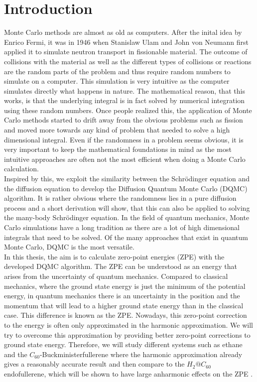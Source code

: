 \documentclass [12pt]{report}
\begin{document}
\chapter{Introduction}
Monte Carlo methods are almost as old as computers. After the inital idea by Enrico Fermi, it was in 1946 when Stanislaw Ulam and John von Neumann first applied it to simulate neutron transport in fissionable material. The outcome of collisions with the material as well as the different types of collisions or reactions are the random parts of the problem and thus require random numbers to simulate on a computer. This simulation is very intuitive as the computer simulates directly what happens in nature. The mathematical reason, that this works, is that the underlying integral is in fact solved by numerical integration using these random numbers. Once people realized this, the application of Monte Carlo methods started to drift away from the obvious problems such as fission and moved more towards any kind of problem that needed to solve a high dimensional integral. Even if the randomness in a problem seems obvious, it is very important to keep the mathematical foundations in mind as the most intuitive approaches are often not the most efficient when doing a Monte Carlo calculation.\\
Inspired by this, we exploit the similarity between the Schrödinger equation and the diffusion equation to develop the Diffusion Quantum Monte Carlo (DQMC) algorithm. It is rather obvious where the randomness lies in a pure diffusion process and a short derivation will show, that this can also be applied to solving the many-body Schrödinger equation. In the field of quantum mechanics, Monte Carlo simulations have a long tradition as there are a lot of high dimensional integrals that need to be solved. Of the many approaches that exist in quantum Monte Carlo, DQMC is the most versatile.\\
In this thesis, the aim is to calculate zero-point energies (ZPE) with the developed DQMC algorithm. The ZPE can be understood as an energy that arises from the uncertainty of quantum mechanics. Compared to classical mechanics, where the ground state energy is just the minimum of the potential energy, in quantum mechanics there is an uncertainty in the position and the momentum that will lead to a higher ground state energy than in the classical case. This difference is known as the ZPE. Nowadays, this zero-point correction to the energy is often only approximated in the harmonic approximation. We will try to overcome this approximation by providing better zero-point corrections to ground state energy.
Therefore, we will study different systems such as ethane  and the $C_{60}$-Buckministerfullerene where the harmonic approximation already gives a reasonably accurate result and then compare to the $H_2@C_{60}$ endofullerene, which will be shown to have large anharmonic effects on the ZPE \cite{h2@c60}.
\end{document}
